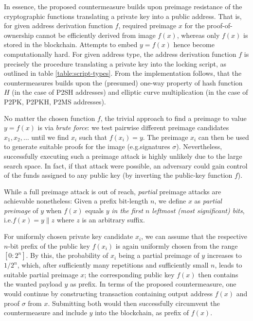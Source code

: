 \documentclass[a4paper,11pt,titlepage]{scrbook}
\begin{document}
In essence, the proposed countermeasure builds upon preimage resistance of the cryptographic functions translating a private key into a public address. %
That is, for given address derivation function $f$, required preimage $x$ for the proof-of-ownership cannot be efficiently derived from image $f(x)$, whereas only $f(x)$ is stored in the blockchain.
Attempts to embed $y=f(x)$ hence become computationally hard.
For given address type, the address derivation function $f$ is precisely the procedure translating a private key into the locking script, as outlined in table \ref{table:script-types}.
%
From the implementation follows, that the countermeasures builds upon the (presumed) one-way property of hash function $H$ (in the case of P2SH addresses) and elliptic curve multiplication (in the case of P2PK, P2PKH, P2MS addresses).

No matter the chosen function $f$, the trivial approach to find a preimage to value $y=f(x)$ is via \emph{brute force}: we test pairwise different preimage candidates $x_1, x_2, \dots$ until we find $x_i$ such that $f(x_i)=y$.
The preimage $x_i$ can then be used to generate suitable proofs for the image (e.g.\@ signatures $\sigma$).
Nevertheless, successfully executing such a preimage attack is highly unlikely due to the large search space.
In fact, if that attack were possible, an adversary could gain control of the funds assigned to any public key (by inverting the public-key function $f$).

While a full preimage attack is out of reach, \emph{partial} preimage attacks are achievable nonetheless:
Given a prefix bit-length $n$, we define $x$ as \emph{partial preimage} of $y$ when $f(x)$ equals $y$ \emph{in the first $n$ leftmost (most significant) bits}, i.e.\@ $f(x)=y\|z$ where $z$ is an arbitrary suffix.

For uniformly chosen private key candidate $x_i$, we can assume that the respective $n$-bit prefix of the public key $f(x_i)$ is again uniformly chosen from the range $[0{:}2^n]$.
By this, the probability of $x_i$ being a partial preimage of $y$ increases to $1/2^n$, which, after sufficiently many repetitions and sufficiently small $n$, leads to suitable partial preimage $x$; the corresponding public key $f(x)$ then contains the wanted payload $y$ as prefix.
In terms of the proposed countermeasure, one would continue by constructing transaction containing output address $f(x)$ and proof $\sigma$ from $x$.
Submitting both would then successfully circumvent the countermeasure and include $y$ into the blockchain, as prefix of $f(x)$.
\end{document}
